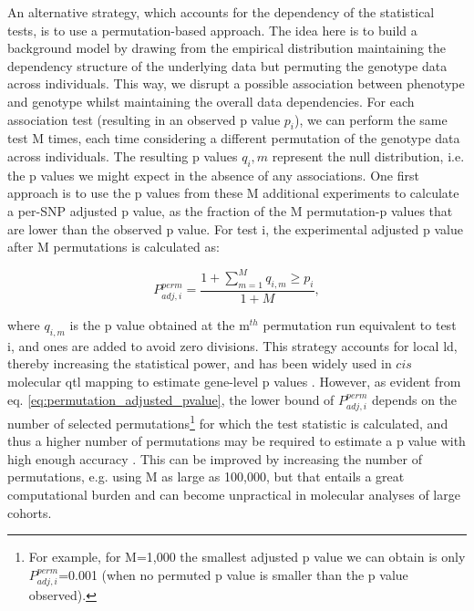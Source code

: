 An alternative strategy, which accounts for the dependency of the statistical tests, is to use a permutation-based approach. 
The idea here is to build a background model by drawing from the empirical distribution maintaining the dependency structure of the underlying data but permuting the genotype data across individuals.
This way, we disrupt a possible association between phenotype and genotype whilst maintaining the overall data dependencies. 
For each association test (resulting in an observed p value $p_i$), we can perform the same test M times, each time considering a different permutation of the genotype data across individuals. 
The resulting p values $q_i,m$ represent the null distribution, i.e. the p values we might expect in the absence of any associations.
One first approach is to use the
p values from these M additional experiments
to calculate a per-SNP adjusted p value, as the fraction of the M permutation-p values that are lower than the observed p value. 
For test i, the experimental adjusted p value after M permutations is calculated as:

\begin{equation}\label{eq:permutation_adjusted_pvalue}
    P_{adj,i}^{perm} = \frac{1+\sum_{m=1}^{M} q_{i,m} \geq p_i}{1+M},
\end{equation}

where $q_{i,m}$ is the p value obtained at the m$^{th}$ permutation run equivalent to test i, and ones are added to avoid zero divisions.  
This strategy accounts for local \gls{ld}, thereby increasing the statistical power, and has been widely used in $cis$ molecular \gls{qtl} mapping to estimate gene-level p values \cite{gtex2015genotype, sudmant2015integrated}. 
However, as evident from eq. \eqref{eq:permutation_adjusted_pvalue}, the lower bound of $P_{adj,i}^{perm}$ depends on the number of selected permutations\footnote{For example, for M=1,000 the smallest adjusted p value we can obtain is only $P_{adj,i}^{perm}$=0.001 (when no permuted p value is smaller than the p value observed).} for which the test statistic is calculated, and thus a higher number of permutations may be required to estimate a p value with high enough accuracy \cite{sul2015accurate}.
This can be improved by increasing the number of permutations, e.g. using M as large as 100,000, but that entails a great computational burden and can become unpractical in molecular analyses of large cohorts.
\\

